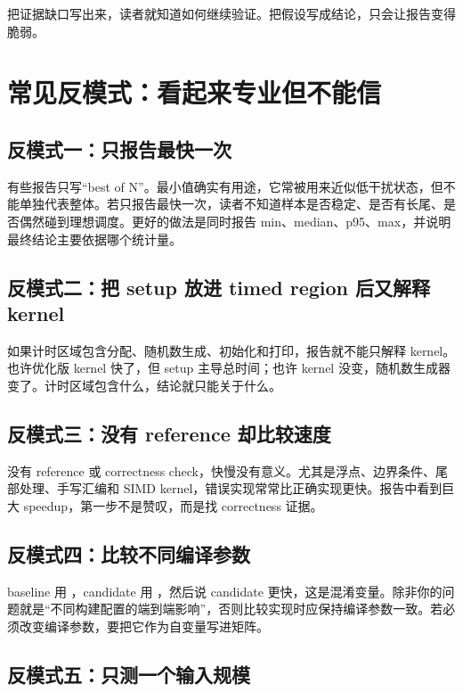 把证据缺口写出来，读者就知道如何继续验证。把假设写成结论，只会让报告变得脆弱。

\section{常见反模式：看起来专业但不能信}

\subsection{反模式一：只报告最快一次}

有些报告只写“best of N”。最小值确实有用途，它常被用来近似低干扰状态，但不能单独代表整体。若只报告最快一次，读者不知道样本是否稳定、是否有长尾、是否偶然碰到理想调度。更好的做法是同时报告 min、median、p95、max，并说明最终结论主要依据哪个统计量。

\subsection{反模式二：把 setup 放进 timed region 后又解释 kernel}

如果计时区域包含分配、随机数生成、初始化和打印，报告就不能只解释 kernel。也许优化版 kernel 快了，但 setup 主导总时间；也许 kernel 没变，随机数生成器变了。计时区域包含什么，结论就只能关于什么。

\subsection{反模式三：没有 reference 却比较速度}

没有 reference 或 correctness check，快慢没有意义。尤其是浮点、边界条件、尾部处理、手写汇编和 SIMD kernel，错误实现常常比正确实现更快。报告中看到巨大 speedup，第一步不是赞叹，而是找 correctness 证据。

\subsection{反模式四：比较不同编译参数}

baseline 用 ，candidate 用 ，然后说 candidate 更快，这是混淆变量。除非你的问题就是“不同构建配置的端到端影响”，否则比较实现时应保持编译参数一致。若必须改变编译参数，要把它作为自变量写进矩阵。

\subsection{反模式五：只测一个输入规模}

